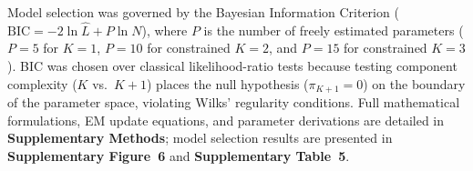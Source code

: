 Model selection was governed by the Bayesian Information Criterion ($\text{BIC} = -2\ln \hat{L} + P \ln N$), where $P$ is the number of freely estimated parameters ($P = 5$ for $K=1$, $P = 10$ for constrained $K=2$, and $P = 15$ for constrained $K=3$). BIC was chosen over classical likelihood-ratio tests because testing component complexity ($K$ vs.\ $K+1$) places the null hypothesis ($\pi_{K+1} = 0$) on the boundary of the parameter space, violating Wilks' regularity conditions. Full mathematical formulations, EM update equations, and parameter derivations are detailed in \textbf{Supplementary Methods}; model selection results are presented in \textbf{Supplementary Figure~6} and \textbf{Supplementary Table~5}.

